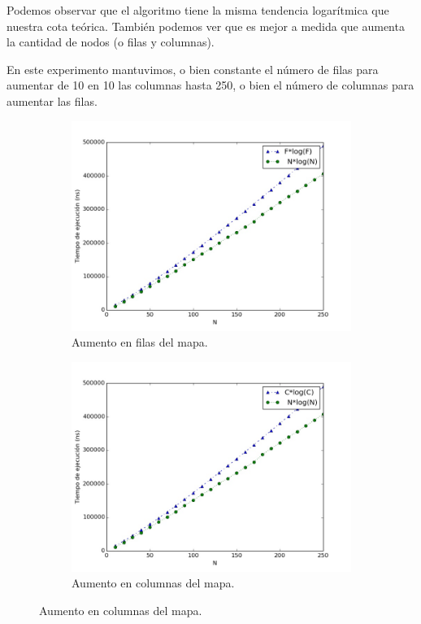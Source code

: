 \documentclass[spanish,12pt]{article}
\begin{document}
Podemos observar que el algoritmo tiene la misma tendencia logarítmica que nuestra cota teórica. También podemos ver que es mejor a medida que aumenta la cantidad de nodos (o filas y columnas).


En este experimento mantuvimos, o bien constante el número de filas para aumentar de 10 en 10 las columnas hasta 250, o bien el número de columnas para aumentar las filas.


\begin{figure}[!ht]
    \centering
    \begin{subfigure}{0.45\textwidth}
        \includegraphics[width=\textwidth]{soloFilas}
        \caption{Aumento en filas del mapa.}
        \label{}
    \end{subfigure}
    \begin{subfigure}{0.45\textwidth}
        \includegraphics[width=\textwidth]{soloColumnas}
        \caption{Aumento en columnas del mapa.}
        \label{}
    \end{subfigure}
\end{figure}
\end{document}
